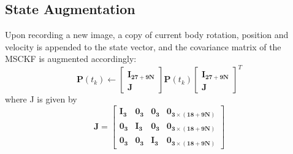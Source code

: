 \documentclass[a4paper, 10pt, conference]{ieeeconf}      %
\begin{document}
\subsection{State Augmentation}
Upon recording a new image, a copy of current body rotation, position and velocity is appended
to the state vector, and the covariance matrix of the MSCKF is augmented accordingly:
\begin{equation}
\bm{P}(t_k) \leftarrow \left[ \begin{matrix}  \bm {I_{27+9N}} \\  \bm J \end{matrix}  \right]  \bm{P}(t_k)\left[ \begin{matrix}  \bm {I_{27+9N}} \\  \bm J \end{matrix}  \right]^T
\end{equation}
where J is given by 
\begin{equation}
\bm J = \left[ \begin{matrix}  \bm {I_{3}} & \bm {0_{3}} & \bm {0_{3}} & \bm {0_{3 \times {(18+9N)}}} \\ 
  \bm {0_{3}} & \bm {I_{3}} & \bm {0_{3}} & \bm {0_{3 \times {(18+9N)}}} \\ 
   \bm {0_{3}} & \bm {0_{3}} & \bm {I_{3}} & \bm {0_{3 \times {(18+9N)}}} 
   \end{matrix}  \right] 
\end{equation}
\end{document}
